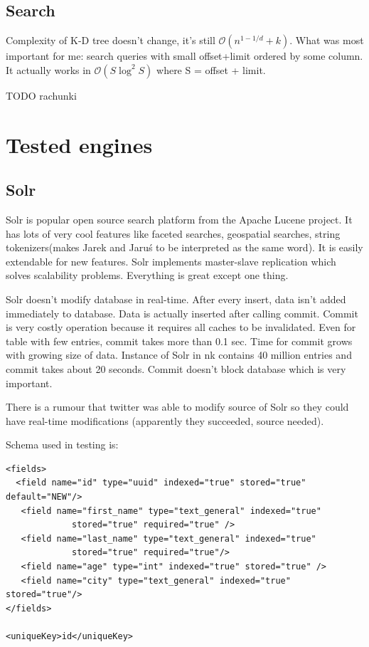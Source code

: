 \documentclass[10pt,a4paper]{article}
\newcommand{\Oh}{\mathcal{O}}
\begin{document}
\subsection{Search}
Complexity of K-D tree doesn't change, it's still $\Oh(n^{1-1/d} + k)$. What was most important for me: search queries with small offset+limit ordered by some column. It actually works in $\Oh(S \log^2 S)$ where S = offset + limit. 

TODO rachunki


\section{Tested engines}
\subsection{Solr}

Solr is popular open source search platform from the Apache Lucene project. It has lots of very cool features like faceted searches, geospatial searches, string tokenizers(makes Jarek and Jaruś to be interpreted as the same word). It is easily extendable for new features. Solr implements master-slave replication which solves scalability problems. Everything is great except one thing. 

Solr doesn't modify database in real-time. After every insert, data isn't added immediately to database. Data is actually inserted after calling commit. Commit is very costly operation because it requires all caches to be invalidated.
Even for table with few entries, commit takes more than 0.1 sec. Time for commit grows with growing size of data. Instance of Solr in nk contains 40 million entries and commit takes about 20 seconds. Commit doesn't block database which is very important.

There is a rumour that twitter was able to modify source of Solr so they could have real-time modifications (apparently they succeeded, source needed).

Schema used in testing is:

\begin{lstlisting}
<fields>
  <field name="id" type="uuid" indexed="true" stored="true" default="NEW"/>
   <field name="first_name" type="text_general" indexed="true"
             stored="true" required="true" /> 
   <field name="last_name" type="text_general" indexed="true" 
             stored="true" required="true"/>
   <field name="age" type="int" indexed="true" stored="true" /> 
   <field name="city" type="text_general" indexed="true" stored="true"/>
</fields>

<uniqueKey>id</uniqueKey> 
\end{lstlisting}
\end{document}
